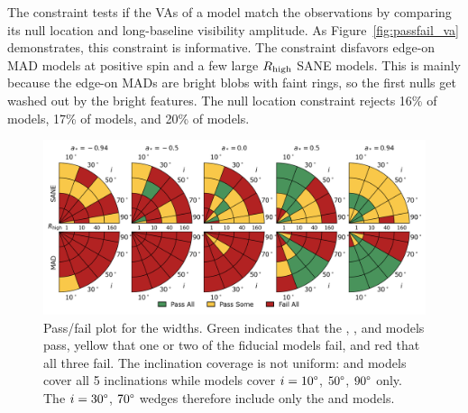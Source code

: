 \label{sec:vam}

The \vam constraint tests if the VAs of a model match the
observations by comparing its null location and long-baseline visibility
amplitude.
As Figure~\ref{fig:passfail_va} demonstrates, this constraint is
informative.
The constraint disfavors edge-on MAD models at positive spin and a few large $R_\mathrm{high}$ SANE models.
This is mainly because the edge-on MADs are bright blobs with faint rings, so the first nulls get washed out by the bright features.
The null location constraint rejects 16\% of \kharma models, 17\% of \bhac models, and 20\% of \hamr models.


\begin{figure}
 \centering
 \includegraphics[width=\textwidth]{./figures/Mring_w_Constraints.png}
  \caption{Pass/fail plot for the \mring widths.
    Green indicates that the \kharma, \bhac, and \hamr models pass, yellow that one or two of the fiducial models fail, and red that all three fail.
    The inclination coverage is not uniform: \bhac and \kharma models cover all 5 inclinations while \hamr models cover $i = 10\degree$, $50\degree$, $90\degree$ only.
    The $i = 30\degree$, $70\degree$ wedges therefore include only the \bhac and \kharma models.}
  \label{fig:mring_width_salsa} %
\end{figure}

